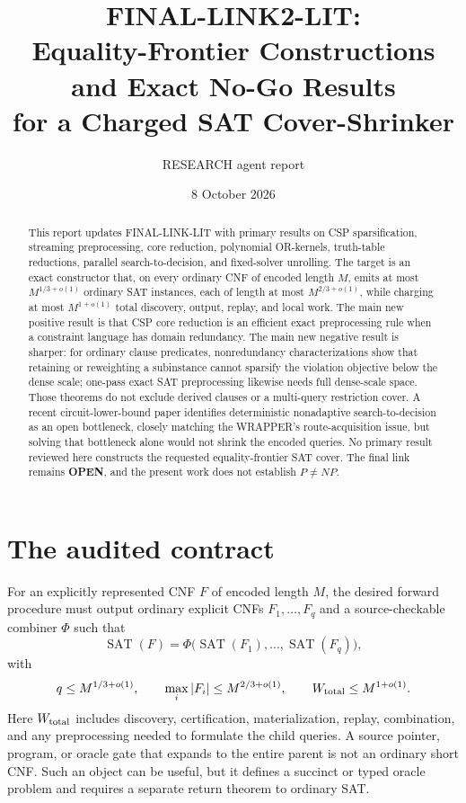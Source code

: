 \documentclass[11pt]{article}
\title{FINAL-LINK2-LIT:\\Equality-Frontier Constructions and Exact No-Go Results\\for a Charged SAT Cover-Shrinker}
\author{RESEARCH agent report}
\date{8 October 2026}
\newcommand{\SAT}{\operatorname{SAT}}
\begin{document}
\maketitle

\begin{abstract}
This report updates FINAL-LINK-LIT with primary results on CSP
sparsification, streaming preprocessing, core reduction, polynomial
OR-kernels, truth-table reductions, parallel search-to-decision, and
fixed-solver unrolling.  The target is an exact constructor that, on every
ordinary CNF of encoded length $M$, emits at most $M^{1/3+o(1)}$ ordinary
SAT instances, each of length at most $M^{2/3+o(1)}$, while charging at most
$M^{1+o(1)}$ total discovery, output, replay, and local work.  The main new
positive result is that CSP core reduction is an efficient exact
preprocessing rule when a constraint language has domain redundancy.  The
main new negative result is sharper: for ordinary clause predicates,
nonredundancy characterizations show that retaining or reweighting a
subinstance cannot sparsify the violation objective below the dense scale;
one-pass exact SAT preprocessing likewise needs full dense-scale space.
Those theorems do not exclude derived clauses or a multi-query restriction
cover.  A recent circuit-lower-bound paper identifies deterministic
nonadaptive search-to-decision as an open bottleneck, closely matching the
WRAPPER's route-acquisition issue, but solving that bottleneck alone would
not shrink the encoded queries.  No primary result reviewed here constructs
the requested equality-frontier SAT cover.  The final link remains
\textbf{OPEN}, and the present work does not establish $P\ne NP$.
\end{abstract}

\section{The audited contract}

For an explicitly represented CNF $F$ of encoded length $M$, the desired
forward procedure must output ordinary explicit CNFs $F_1,\ldots,F_q$ and a
source-checkable combiner $\Phi$ such that
\begin{equation}
 \SAT(F)=\Phi\bigl(\SAT(F_1),\ldots,\SAT(F_q)\bigr),
\end{equation}
with
\begin{equation}
 q\le M^{1/3+o(1)},\qquad
 \max_i |F_i|\le M^{2/3+o(1)},\qquad
 W_{\rm total}\le M^{1+o(1)}.
\end{equation}
Here $W_{\rm total}$ includes discovery, certification, materialization,
replay, combination, and any preprocessing needed to formulate the child
queries.  A source pointer, program, or oracle gate that expands to the
entire parent is not an ordinary short CNF.  Such an object can be useful,
but it defines a succinct or typed oracle problem and requires a separate
return theorem to ordinary SAT.
\end{document}
